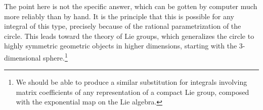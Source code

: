 \documentclass[11pt]{article}
\begin{document}
The point here is not the specific answer, which can be gotten by computer
much more reliably than by hand. 
It is the principle that this is possible for any integral of this type, 
precisely because of the rational parametrization of the circle. 
This leads toward the theory of Lie groups, which generalizes the circle 
to highly symmetric geometric objects in higher dimensions,
starting with the 3-dimensional sphere.\footnote{
We should be able to produce a similar substitution for
integrals involving matrix coefficients of any representation of a compact
Lie group, composed with the exponential map on the Lie algebra.
}
\end{document}
